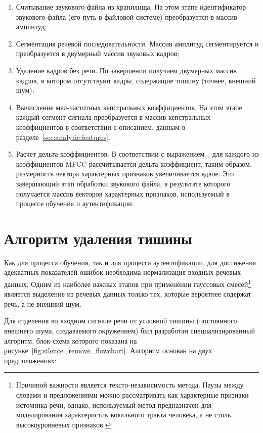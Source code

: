 \begin{enumerate}
\item Считывание звукового файла из хранилища. На этом этапе идентификатор звукового файла (его путь в файловой системе) преобразуется в массив амплитуд;
\item Сегментация речевой последовательности. Массив амплитуд сегментируется и преобразуется в двумерный массив звуковых кадров;
\item Удаление кадров без речи. По завершении получаем двумерных массив кадров, в котором отсутствуют кадры, содержащие тишину (точнее, внешний шум);
\item Вычисление мел-частотных кепстральных коэффициентов. На этом этапе каждый сегмент сигнала преобразуется в массив кепстральных коэффициентов в соответствии с описанием, данным в разделе~\ref{sec:analytic:features}.
\item Расчет дельта-коэффициентов. В соответствии с выражением~, для каждого из коэффициентов MFCC рассчитывается дельта-коэффициент, таким образом, размерность вектора характерных признаков увеличивается вдвое. Это завершающий этап обработки звукового файла, в результате которого получается массив векторов характерных признаков, используемый в процессе обучения и аутентификации.
\end{enumerate}

\section{Алгоритм удаления тишины}
\label{sec:construct:silence_remove}

Как для процесса обучения, так и для процесса аутентификации, для достижения адекватных показателей ошибок необходима нормализация входных речевых данных. Одним из наиболее важных этапов при применении гауссовых смесей\footnote{Причиной важности является тексто-независимость метода. Паузы между словами и предложениями можно рассматривать как характерные признаки источника речи, однако, используемый метод предназначен для моделирования характеристик вокального тракта человека, а не столь высокоуровневых признаков.} является выделение из речевых данных только тех, которые вероятнее содержат речь, а не внешний шум.

Для отделения во входном сигнале речи от условной тишины (постоянного внешнего шума, создаваемого окружением) был разработан специализированный алгоритм, блок-схема которого показана на рисунке~\ref{fig:silence_remove_flowchart}. Алгоритм основан на двух предположениях:

